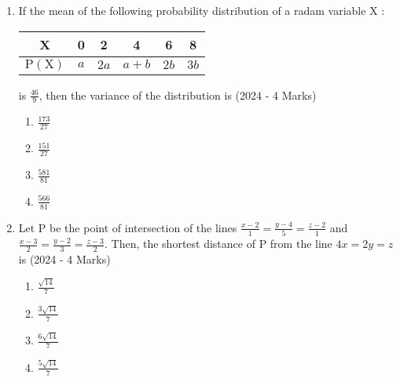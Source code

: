 \documentclass[journal]{IEEEtran}
\begin{document}
\begin{enumerate}
{        	\begin{multicols}{4}
        		\begin{enumerate}
        			\item 24
        			\item 44
        			\item 38
        			\item 42
        		\end{enumerate}
        	\end{multicols}
        	
        }
 	\item{
        	 If the mean of the following probability distribution of a radam variable X :
        	 \begin{center}
	        	\begin{tabular}{|c|c|c|c|c|c|}
	        		\hline X & 0 & 2 & 4 & 6 & 8 \\
	        		\hline $\mathrm{P}(\mathrm{X})$ & $a$ & $2 a$ & $a+b$ & $2 b$ & $3 b$ \\
	        		\hline
	        	\end{tabular}
        	\end{center}
        	is $\frac{46}{9}$, then the variance of the distribution is
        	\hfill
        	{(2024 - 4 Marks)}
        	
        	\begin{multicols}{4}
        		\begin{enumerate}
        			\item $\frac{173}{27}$
        			\item $\frac{151}{27}$
        			\item $\frac{581}{81}$
        			\item $\frac{566}{81}$
        		\end{enumerate}
        	\end{multicols}
        	
        }
 	
 	\item{
			
			Let P be the point of intersection of the lines $\frac{x-2}{1}=\frac{y-4}{5}=\frac{z-2}{1}$ and
			$\frac{x-3}{2}=\frac{y-2}{3}=\frac{z-3}{2}$. Then, the shortest distance of P from the line $4 x=2 y=z$ is\hfill
			{(2024 - 4 Marks)}
			
			\begin{multicols}{4}
				\begin{enumerate}
					\item $\frac{\sqrt{14}}{7}$
					\item $\frac{3 \sqrt{14}}{7}$
					\item $\frac{6 \sqrt{14}}{7}$
					\item $\frac{5 \sqrt{14}}{7}$
				\end{enumerate}
			\end{multicols}
			
}
\end{enumerate}
\end{document}
